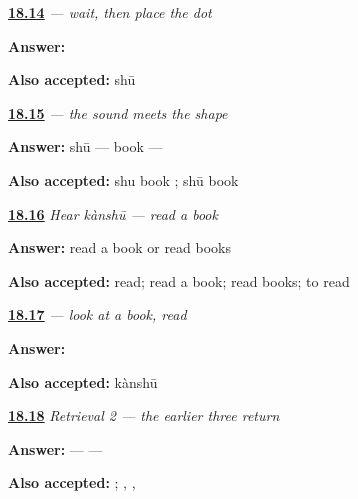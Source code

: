 \noindent\begin{minipage}[t]{\linewidth}
\raggedright
\hyperlink{review-ZH-W18-shu-delayed-write}{\textbf{18.14}} \emph{ — wait, then place the dot}\par
\small \textbf{Answer:} \par
\footnotesize \textbf{Also accepted:}  shū
\end{minipage}\par\medskip

\noindent\begin{minipage}[t]{\linewidth}
\raggedright
\hyperlink{review-ZH-C18-shu-read-write}{\textbf{18.15}} \emph{ — the sound meets the shape}\par
\small \textbf{Answer:} shū — book — \par
\footnotesize \textbf{Also accepted:} shu book ; shū book 
\end{minipage}\par\medskip

\noindent\begin{minipage}[t]{\linewidth}
\raggedright
\hyperlink{review-ZH-C18-hear-kanshu-meaning}{\textbf{18.16}} \emph{Hear \emph{kànshū} — read a book}\par
\small \textbf{Answer:} read a book or read books\par
\footnotesize \textbf{Also accepted:} read; read a book; read books; to read
\end{minipage}\par\medskip

\noindent\begin{minipage}[t]{\linewidth}
\raggedright
\hyperlink{review-ZH-C18-kanshu-write}{\textbf{18.17}} \emph{ — look at a book, read}\par
\small \textbf{Answer:} \par
\footnotesize \textbf{Also accepted:}  kànshū
\end{minipage}\par\medskip

\noindent\begin{minipage}[t]{\linewidth}
\raggedright
\hyperlink{review-ZH-R18-looking-three-r2-order}{\textbf{18.18}} \emph{Retrieval 2 — the earlier three return}\par
\small \textbf{Answer:}  —  — \par
\footnotesize \textbf{Also accepted:}   ; , , 
\end{minipage}\par\medskip

